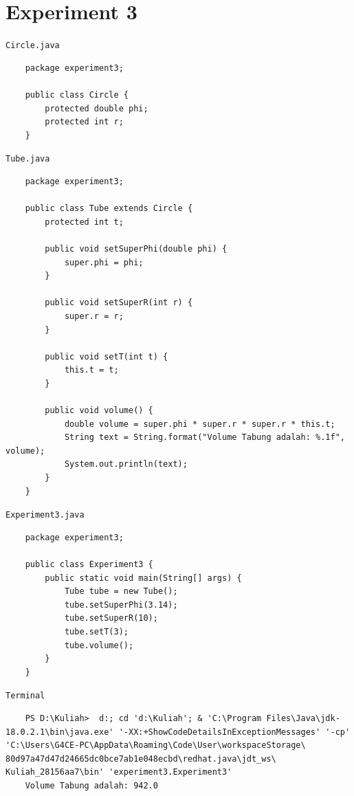 \documentclass[12pt,titlepage]{article}
\begin{document}
\section{Experiment 3}
\texttt{Circle.java}
\begin{verbatim}
    package experiment3;

    public class Circle {
        protected double phi;
        protected int r;
    }
\end{verbatim}

\texttt{Tube.java}
\begin{verbatim}
    package experiment3;

    public class Tube extends Circle {
        protected int t;
        
        public void setSuperPhi(double phi) {
            super.phi = phi;
        }
        
        public void setSuperR(int r) {
            super.r = r;
        }

        public void setT(int t) {
            this.t = t;
        }

        public void volume() {
            double volume = super.phi * super.r * super.r * this.t;
            String text = String.format("Volume Tabung adalah: %.1f", volume);
            System.out.println(text);
        }
    }
\end{verbatim}

\texttt{Experiment3.java}
\begin{verbatim}
    package experiment3;

    public class Experiment3 {
        public static void main(String[] args) {
            Tube tube = new Tube();
            tube.setSuperPhi(3.14);
            tube.setSuperR(10);
            tube.setT(3);
            tube.volume();
        }
    }
\end{verbatim}

\texttt{Terminal}
\begin{verbatim}
    PS D:\Kuliah>  d:; cd 'd:\Kuliah'; & 'C:\Program Files\Java\jdk-18.0.2.1\bin\java.exe' '-XX:+ShowCodeDetailsInExceptionMessages' '-cp' 'C:\Users\G4CE-PC\AppData\Roaming\Code\User\workspaceStorage\ 80d97a47d47d24665dc0bce7ab1e048ecbd\redhat.java\jdt_ws\ Kuliah_28156aa7\bin' 'experiment3.Experiment3'
    Volume Tabung adalah: 942.0
\end{verbatim}

\newpage
\end{document}
